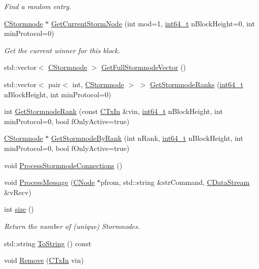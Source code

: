 \begin{DoxyCompactItemize}
\begin{DoxyCompactList}\small\item\em Find a random entry. \end{DoxyCompactList}\item 
\hyperlink{class_c_stormnode}{C\+Stormnode} $\ast$ \hyperlink{class_c_stormnode_man_aad6c3131e73e2b686f3847148b536448}{Get\+Current\+Storm\+Node} (int mod=1, \hyperlink{stdint_8h_adec1df1b8b51cb32b77e5b86fff46471}{int64\+\_\+t} n\+Block\+Height=0, int min\+Protocol=0)
\begin{DoxyCompactList}\small\item\em Get the current winner for this block. \end{DoxyCompactList}\item 
std\+::vector$<$ \hyperlink{class_c_stormnode}{C\+Stormnode} $>$ \hyperlink{class_c_stormnode_man_a7002dd29b10a0db885c361f1d9981de8}{Get\+Full\+Stormnode\+Vector} ()
\item 
std\+::vector$<$ pair$<$ int, \hyperlink{class_c_stormnode}{C\+Stormnode} $>$ $>$ \hyperlink{class_c_stormnode_man_a5337440744bbc51b2e7a9752c3613a26}{Get\+Stormnode\+Ranks} (\hyperlink{stdint_8h_adec1df1b8b51cb32b77e5b86fff46471}{int64\+\_\+t} n\+Block\+Height, int min\+Protocol=0)
\item 
int \hyperlink{class_c_stormnode_man_ad1fb56e4ee364e2b18bab57210f3f3cd}{Get\+Stormnode\+Rank} (const \hyperlink{class_c_tx_in}{C\+Tx\+In} \&vin, \hyperlink{stdint_8h_adec1df1b8b51cb32b77e5b86fff46471}{int64\+\_\+t} n\+Block\+Height, int min\+Protocol=0, bool f\+Only\+Active=true)
\item 
\hyperlink{class_c_stormnode}{C\+Stormnode} $\ast$ \hyperlink{class_c_stormnode_man_af631f4c124f3022e4c388d759ca69605}{Get\+Stormnode\+By\+Rank} (int n\+Rank, \hyperlink{stdint_8h_adec1df1b8b51cb32b77e5b86fff46471}{int64\+\_\+t} n\+Block\+Height, int min\+Protocol=0, bool f\+Only\+Active=true)
\item 
void \hyperlink{class_c_stormnode_man_a52708159ad91808d18a0b6082ed6daca}{Process\+Stormnode\+Connections} ()
\item 
void \hyperlink{class_c_stormnode_man_ae30d0b9b493e23c3d14ec48c77be7b6f}{Process\+Message} (\hyperlink{class_c_node}{C\+Node} $\ast$pfrom, std\+::string \&str\+Command, \hyperlink{class_c_data_stream}{C\+Data\+Stream} \&v\+Recv)
\item 
int \hyperlink{class_c_stormnode_man_ad15cbc672903cce82c757118b74c267c}{size} ()
\begin{DoxyCompactList}\small\item\em Return the number of (unique) Stormnodes. \end{DoxyCompactList}\item 
std\+::string \hyperlink{class_c_stormnode_man_a5c49bb4788cad79574d90fdca8ea7464}{To\+String} () const 
\item 
void \hyperlink{class_c_stormnode_man_ad1732f409f53dc6186c6bb40894f1ed5}{Remove} (\hyperlink{class_c_tx_in}{C\+Tx\+In} vin)
\end{DoxyCompactItemize}
